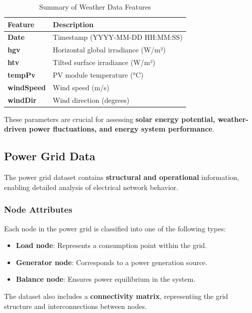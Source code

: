 \documentclass[12pt]{article}
\begin{document}
\begin{table}[h]
    \centering
    \begin{tabular}{ll}
        \toprule
        \textbf{Feature} & \textbf{Description} \\
        \midrule
        \textbf{Date}  & Timestamp (YYYY-MM-DD HH:MM:SS) \\
        \textbf{hgv}   & Horizontal global irradiance (W/m²) \\
        \textbf{htv}   & Tilted surface irradiance (W/m²) \\
        \textbf{tempPv} & PV module temperature (°C) \\
        \textbf{windSpeed} & Wind speed (m/s) \\
        \textbf{windDir} & Wind direction (degrees) \\
        \bottomrule
    \end{tabular}
    \caption{Summary of Weather Data Features}
    \label{tab:weather}
\end{table}

These parameters are crucial for assessing \textbf{solar energy potential, weather-driven power fluctuations, and energy system performance}.

\subsection*{Power Grid Data}
The power grid dataset contains \textbf{structural and operational} information, enabling detailed analysis of electrical network behavior.

\subsubsection*{Node Attributes}
Each node in the power grid is classified into one of the following types:
\begin{itemize}
    \item \textbf{Load node}: Represents a consumption point within the grid.
    \item \textbf{Generator node}: Corresponds to a power generation source.
    \item \textbf{Balance node}: Ensures power equilibrium in the system.
\end{itemize}
The dataset also includes a \textbf{connectivity matrix}, representing the grid structure and interconnections between nodes.
\end{document}
